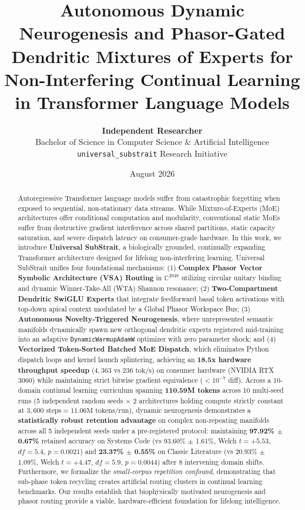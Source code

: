 \documentclass[10pt,twocolumn,letterpaper]{article}
\title{\textbf{Autonomous Dynamic Neurogenesis and Phasor-Gated Dendritic Mixtures of Experts for Non-Interfering Continual Learning in Transformer Language Models}}
\author{
  \textbf{Independent Researcher} \\
  Bachelor of Science in Computer Science \& Artificial Intelligence \\
  \texttt{universal\_substrait} Research Initiative
}
\date{August 2026}
\begin{document}
\maketitle

\begin{abstract}
Autoregressive Transformer language models suffer from catastrophic forgetting when exposed to sequential, non-stationary data streams. While Mixture-of-Experts (MoE) architectures offer conditional computation and modularity, conventional static MoEs suffer from destructive gradient interference across shared partitions, static capacity saturation, and severe dispatch latency on consumer-grade hardware. In this work, we introduce \textbf{Universal SubStrait}, a biologically grounded, continually expanding Transformer architecture designed for lifelong non-interfering learning. Universal SubStrait unifies four foundational mechanisms:
(1) \textbf{Complex Phasor Vector Symbolic Architecture (VSA) Routing} in $\mathbb{C}^{2048}$ utilizing circular unitary binding and dynamic Winner-Take-All (WTA) Shannon resonance;
(2) \textbf{Two-Compartment Dendritic SwiGLU Experts} that integrate feedforward basal token activations with top-down apical context modulated by a Global Phasor Workspace Bus;
(3) \textbf{Autonomous Novelty-Triggered Neurogenesis}, where unrepresented semantic manifolds dynamically spawn new orthogonal dendritic experts registered mid-training into an adaptive \texttt{DynamicWarmupAdamW} optimizer with zero parameter shock; and
(4) \textbf{Vectorized Token-Sorted Batched MoE Dispatch}, which eliminates Python dispatch loops and kernel launch splintering, achieving an \textbf{18.5x hardware throughput speedup} ($4,363$ vs $236\text{ tok/s}$) on consumer hardware (NVIDIA RTX 3060) while maintaining strict bitwise gradient equivalence ($< 10^{-7}$ diff).
Across a 10-domain continual learning curriculum spanning \textbf{110.59M tokens} across 10 multi-seed runs (5 independent random seeds $\times$ 2 architectures holding compute strictly constant at $3,600\text{ steps} = 11.06\text{M tokens/run}$), dynamic neurogenesis demonstrates a \textbf{statistically robust retention advantage} on complex non-repeating manifolds across all 5 independent seeds under a pre-registered protocol: maintaining \textbf{97.92\% $\pm$ 0.67\%} retained accuracy on Systems Code (vs 93.60\% $\pm$ 1.61\%, Welch $t = +5.53$, $df = 5.4$, $p = 0.0021$) and \textbf{23.37\% $\pm$ 0.55\%} on Classic Literature (vs 20.93\% $\pm$ 1.09\%, Welch $t = +4.47$, $df = 5.9$, $p = 0.0044$) after 8 intervening domain shifts. Furthermore, we formalize the \textit{small-corpus repetition confound}, demonstrating that sub-phase token recycling creates artificial routing clusters in continual learning benchmarks. Our results establish that biophysically motivated neurogenesis and phasor routing provide a viable, hardware-efficient foundation for lifelong intelligence.
\end{abstract}
\end{document}
